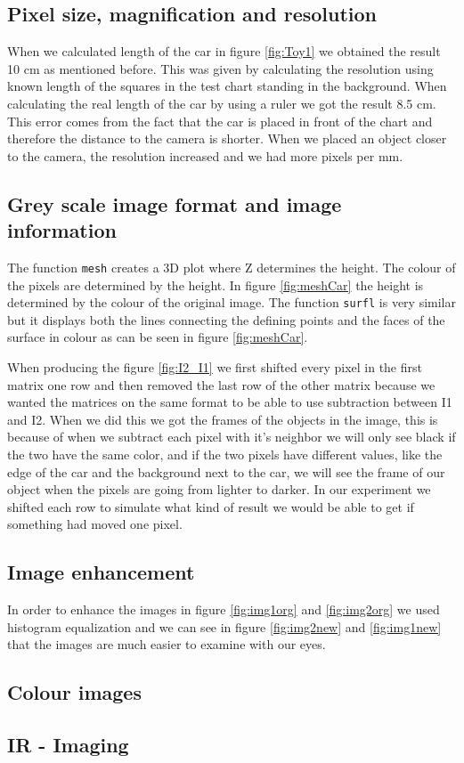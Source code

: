 \subsection{Pixel size, magnification and resolution}
When we calculated length of the car in figure \ref{fig:Toy1} we obtained the result 10 cm as mentioned before. This was given by calculating the resolution using known length of the squares in the test chart standing in the background. When calculating the real length of the car by using a ruler we got the result 8.5 cm. This error comes from the fact that the car is placed in front of the chart and therefore the distance to the camera is shorter. When we placed an object closer to the camera, the resolution increased and we had more pixels per mm. 

\subsection{Grey scale image format and image information}
The function \texttt{mesh} creates a 3D plot where Z determines the height. The colour of the pixels are determined by the height. In figure \ref{fig:meshCar} the height is determined by the colour of the original image. The function \texttt{surfl} is very similar but it displays both the lines connecting the defining points and the faces of the surface in colour as can be seen in figure \ref{fig:meshCar}.

When producing the figure \ref{fig:I2_I1} we first shifted every pixel in the first matrix one row and then removed the last row of the other matrix because we wanted the matrices on the same format to be able to use subtraction between I1 and I2. When we did this we got the frames of the objects in the image, this is because of when we subtract each pixel with it's neighbor we will only see black if the two have the same color, and if the two pixels have different values, like the edge of the car and the background next to the car, we will see the frame of our object when the pixels are going from lighter to darker. In our experiment we shifted each row to simulate what kind of result we would be able to get if something had moved one pixel.

\subsection{Image enhancement}
In order to enhance the images in figure \ref{fig:img1org} and \ref{fig:img2org} we used histogram equalization and we can see in figure \ref{fig:img2new} and \ref{fig:img1new} that the images are much easier to examine with our eyes. 
\subsection{Colour images}

\subsection{IR - Imaging}